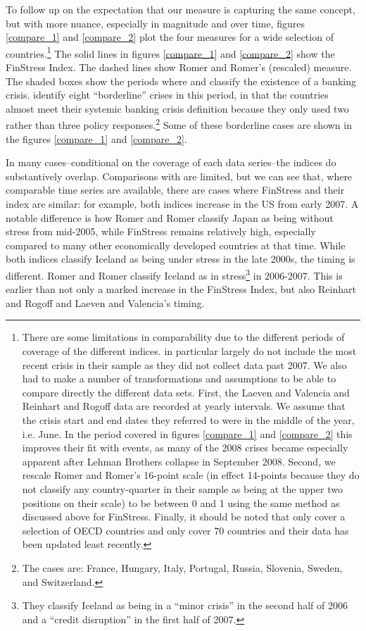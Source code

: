 \documentclass[]{article}
\begin{document}
To follow up on the expectation that our measure is capturing the same concept, but with more nuance, especially in magnitude and over time, figures \ref{compare_1} and \ref{compare_2} plot the four measures for a wide selection of countries.\footnote{There are some limitations in comparability due to the different periods of coverage of the different indices. \cite{Romer2015} in particular largely do not include the most recent crisis in their sample as they did not collect data past 2007. We also had to make a number of transformations and assumptions to be able to  compare directly the different data sets. First, the Laeven and Valencia and Reinhart and Rogoff data are recorded at yearly intervals. We assume that the crisis start and end dates they referred to were in the middle of the year, i.e. June. In the period covered in figures \ref{compare_1} and \ref{compare_2} this improves their fit with events, as many of the 2008 crises became especially apparent after Lehman Brothers collapse in September 2008. Second, we rescale Romer and Romer's 16-point scale (in effect 14-points because they do not classify any country-quarter in their sample as being at the upper two positions on their scale) to be between 0 and 1 using the same method as discussed above for FinStress. Finally, it should be noted that \cite{Romer2015} only cover a selection of OECD countries and \cite{Reinhart2009} only cover 70 countries and their data has been updated least recently.} The solid lines in figures \ref{compare_1} and \ref{compare_2} show the FinStress Index. The dashed lines show Romer and Romer's (rescaled) measure. The shaded boxes show the periods where \cite{laeven2013} and \cite{Reinhart2009} classify the existence of a banking crisis. \cite{laeven2013} identify eight ``borderline'' crises in this period, in that the countries almost meet their systemic banking crisis definition because they only used two rather than three policy responses.\footnote{The cases are: France, Hungary, Italy, Portugal, Russia, Slovenia, Sweden, and Switzerland.} Some of these borderline cases are shown in the figures \ref{compare_1} and \ref{compare_2}.

In many cases--conditional on the coverage of each data series--the indices do substantively overlap. Comparisons with \cite{Romer2015} are limited, but we can see that, where comparable time series are available, there are cases where FinStress and their index are similar: for example, both indices increase in the US from early 2007. A notable difference is how Romer and Romer classify Japan as being without stress from mid-2005, while FinStress remains relatively high, especially compared to many other economically developed countries at that time. While both indices classify Iceland as being under stress in the late 2000s, the timing is different. Romer and Romer classify Iceland as in stress\footnote{They classify Iceland as being in a ``minor crisis'' in the second half of 2006 and a ``credit  disruption'' in the first half of 2007.} in 2006-2007. This is earlier than not only a marked increase in the FinStress Index, but also Reinhart and Rogoff and Laeven and Valencia's timing.
\end{document}

